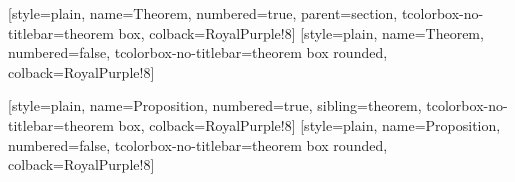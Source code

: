 
\usepackage{amsmath,amsthm,amsfonts,amssymb}
\usepackage{mathtools}
\usepackage{mathrsfs}
\usepackage{bm}
\usepackage{extarrows}
\usepackage[a4paper, margin=1in]{geometry}
\usepackage{float}
\usepackage{indentfirst}
\usepackage{anyfontsize}
\usepackage{booktabs,multirow,multicol}
\usepackage[shortlabels,inline]{enumitem}
\usepackage{appendix}

\usepackage[dvipsnames]{xcolor}
\usepackage{graphicx}
\graphicspath{
    {./figure/}{./figures/}{./image/}{./images/}{./graphic/}{./graphics/}{./picture/}{./pictures/}
}
\usepackage{subcaption}

\usepackage[ruled,linesnumbered,noline]{algorithm2e}
\usepackage{listings}
\lstset{style=simpleStyle}

\usepackage{hyperref}
\hypersetup{
    colorlinks=true,linkcolor=,urlcolor=cyan
}

\renewcommand*{\proofname}{\normalfont\bfseries Proof}

\usepackage[most]{tcolorbox}
\usepackage{keytheorems}



[style=plain, name=Theorem, numbered=true, parent=section,
    tcolorbox-no-titlebar={theorem box, colback=RoyalPurple!8}]
[style=plain, name=Theorem, numbered=false,
    tcolorbox-no-titlebar={theorem box rounded, colback=RoyalPurple!8}]

[style=plain, name=Proposition, numbered=true, sibling=theorem,
    tcolorbox-no-titlebar={theorem box, colback=RoyalPurple!8}]
[style=plain, name=Proposition, numbered=false,
    tcolorbox-no-titlebar={theorem box rounded, colback=RoyalPurple!8}]

